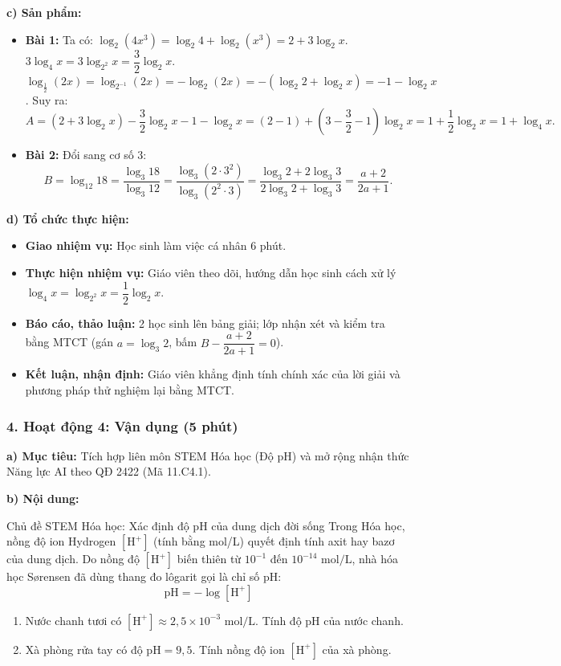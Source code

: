 \documentclass[12pt, a4paper]{article}
\begin{document}
\noindent \textbf{c) Sản phẩm:}
\begin{itemize}
    \item \textbf{Bài 1:}
    Ta có:
    $\log_2 (4x^3) = \log_2 4 + \log_2 (x^3) = 2 + 3\log_2 x$.
    $3\log_4 x = 3\log_{2^2} x = \dfrac{3}{2} \log_2 x$.
    $\log_{\frac{1}{2}} (2x) = \log_{2^{-1}} (2x) = -\log_2 (2x) = -(\log_2 2 + \log_2 x) = -1 - \log_2 x$.
    Suy ra:
    $$A = (2 + 3\log_2 x) - \dfrac{3}{2}\log_2 x - 1 - \log_2 x = (2 - 1) + \left(3 - \dfrac{3}{2} - 1\right)\log_2 x = 1 + \dfrac{1}{2}\log_2 x = 1 + \log_4 x.$$
    \item \textbf{Bài 2:}
    Đổi sang cơ số $3$:
    $$B = \log_{12} 18 = \dfrac{\log_3 18}{\log_3 12} = \dfrac{\log_3 (2 \cdot 3^2)}{\log_3 (2^2 \cdot 3)} = \dfrac{\log_3 2 + 2\log_3 3}{2\log_3 2 + \log_3 3} = \dfrac{a + 2}{2a + 1}.$$
\end{itemize}

\noindent \textbf{d) Tổ chức thực hiện:}
\begin{itemize}[leftmargin=0.6cm]
    \item \textbf{Giao nhiệm vụ:} Học sinh làm việc cá nhân 6 phút.
    \item \textbf{Thực hiện nhiệm vụ:} Giáo viên theo dõi, hướng dẫn học sinh cách xử lý $\log_4 x = \log_{2^2} x = \dfrac{1}{2}\log_2 x$.
    \item \textbf{Báo cáo, thảo luận:} 2 học sinh lên bảng giải; lớp nhận xét và kiểm tra bằng MTCT (gán $a = \log_3 2$, bấm $B - \dfrac{a+2}{2a+1} = 0$).
    \item \textbf{Kết luận, nhận định:} Giáo viên khẳng định tính chính xác của lời giải và phương pháp thử nghiệm lại bằng MTCT.
\end{itemize}

\subsubsection*{4. Hoạt động 4: Vận dụng (5 phút)}

\noindent \textbf{a) Mục tiêu:}
Tích hợp liên môn STEM Hóa học (Độ pH) và mở rộng nhận thức Năng lực AI theo QĐ 2422 (Mã 11.C4.1).

\noindent \textbf{b) Nội dung:}
\begin{stembox}{Chủ đề STEM Hóa học: Xác định độ pH của dung dịch đời sống}
Trong Hóa học, nồng độ ion Hydrogen $[\text{H}^+]$ (tính bằng mol/L) quyết định tính axit hay bazơ của dung dịch. Do nồng độ $[\text{H}^+]$ biến thiên từ $10^{-1}$ đến $10^{-14}\text{ mol/L}$, nhà hóa học Sørensen đã dùng thang đo lôgarit gọi là chỉ số pH:
$$\text{pH} = -\log[\text{H}^+]$$
\begin{enumerate}[leftmargin=0.6cm]
    \item Nước chanh tươi có $[\text{H}^+] \approx 2{,}5 \times 10^{-3}\text{ mol/L}$. Tính độ pH của nước chanh.
    \item Xà phòng rửa tay có độ $\text{pH} = 9{,}5$. Tính nồng độ ion $[\text{H}^+]$ của xà phòng.
\end{enumerate}
\end{stembox}
\end{document}
